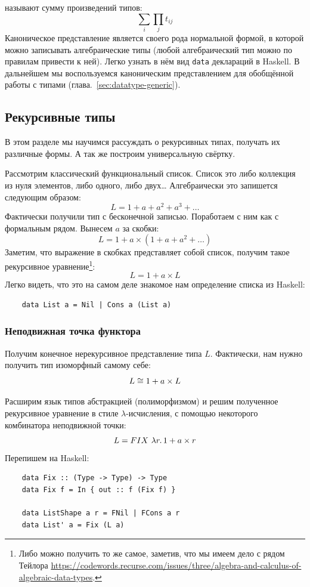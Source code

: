 называют сумму произведений типов:
\[
    \sum_{i}\prod_{j} t_{ij}
\]
Каноническое представление является своего рода нормальной формой, в которой можно записывать алгебраические типы (любой алгебраический тип можно по правилам привести к ней).
Легко узнать в нём вид \texttt{data} деклараций в Haskell.
В дальнейшем мы воспользуемся каноническим представлением для обобщённой работы с типами (глава.~\ref{sec:datatype-generic}).


\subsection{Рекурсивные типы} \label{subsec:recursive-types}

В этом разделе мы научимся рассуждать о рекурсивных типах, получать их различные формы.
А так же построим универсальную свёртку.

Рассмотрим классический функциональный список.
Список это либо коллекция из нуля элементов, либо одного, либо двух\ldots
Алгебраически это запишется следующим образом:
\[
    L = 1 + a + a^2 + a^3 + \ldots
\]
Фактически получили тип с бесконечной записью.
Поработаем с ним как с формальным рядом.
Вынесем $a$ за скобки:
\[
    L = 1 + a \times (1 + a + a^2 + \ldots)
\]
Заметим, что выражение в скобках представляет собой список, получим такое рекурсивное уравнение\footnote{Либо можно получить то же самое, заметив, что мы имеем дело с рядом Тейлора \url{https://codewords.recurse.com/issues/three/algebra-and-calculus-of-algebraic-data-types}.}:
\[
    L = 1 + a \times L
\]
Легко видеть, что это на самом деле знакомое нам определение списка из Haskell:
\begin{verbatim}
    data List a = Nil | Cons a (List a)
\end{verbatim}

\subsubsection{Неподвижная точка функтора}

Получим конечное нерекурсивное представление типа $L$.
Фактически, нам нужно получить тип изоморфный самому себе:
\[
    L \cong 1 + a \times L
\]

Расширим язык типов абстракцией (полиморфизмом) и решим полученное рекурсивное уравнение в стиле $\lambda$-исчисления, с помощью некоторого комбинатора неподвижной точки:
\[
    L = FIX~\lambda r\ldotp 1 + a \times r
\]
Перепишем на Haskell:
\begin{verbatim}
    data Fix :: (Type -> Type) -> Type
    data Fix f = In { out :: f (Fix f) }

    data ListShape a r = FNil | FCons a r
    data List' a = Fix (L a)
\end{verbatim}

